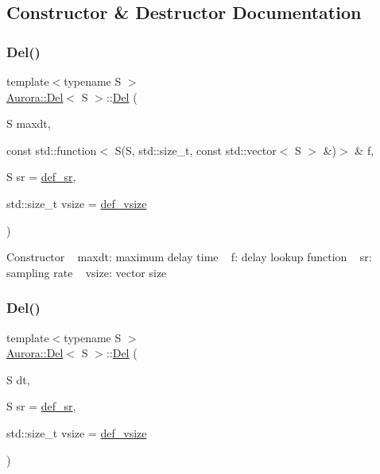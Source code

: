 \subsection{Constructor \& Destructor Documentation}
\mbox{\label{class_aurora_1_1_del_a9a66ca9cf80ef79c4823bc3c3faf348d}} 
\subsubsection{\texorpdfstring{Del()}{Del()}\hspace{0.1cm}{\footnotesize\ttfamily [1/2]}}
{\footnotesize\ttfamily template$<$typename S $>$ \\
\hyperlink{class_aurora_1_1_del}{Aurora\+::\+Del}$<$ S $>$\+::\hyperlink{class_aurora_1_1_del}{Del} (\begin{DoxyParamCaption}\item[{S}]{maxdt,  }\item[{const std\+::function$<$ S(S, std\+::size\+\_\+t, const std\+::vector$<$ S $>$ \&)$>$ \&}]{f,  }\item[{S}]{sr = {\ttfamily \hyperlink{namespace_aurora_ad49263d809bea98dd422e95bc91bc03e}{def\+\_\+sr}},  }\item[{std\+::size\+\_\+t}]{vsize = {\ttfamily \hyperlink{namespace_aurora_afaaddf667a06e7ce23c667a8b7295263}{def\+\_\+vsize}} }\end{DoxyParamCaption})\hspace{0.3cm}{\ttfamily [inline]}}

Constructor ~\newline
maxdt\+: maximum delay time ~\newline
f\+: delay lookup function ~\newline
sr\+: sampling rate ~\newline
vsize\+: vector size \mbox{\label{class_aurora_1_1_del_ae7ee559e909a215a6d8248d9c9a0ced8}} 
\subsubsection{\texorpdfstring{Del()}{Del()}\hspace{0.1cm}{\footnotesize\ttfamily [2/2]}}
{\footnotesize\ttfamily template$<$typename S $>$ \\
\hyperlink{class_aurora_1_1_del}{Aurora\+::\+Del}$<$ S $>$\+::\hyperlink{class_aurora_1_1_del}{Del} (\begin{DoxyParamCaption}\item[{S}]{dt,  }\item[{S}]{sr = {\ttfamily \hyperlink{namespace_aurora_ad49263d809bea98dd422e95bc91bc03e}{def\+\_\+sr}},  }\item[{std\+::size\+\_\+t}]{vsize = {\ttfamily \hyperlink{namespace_aurora_afaaddf667a06e7ce23c667a8b7295263}{def\+\_\+vsize}} }\end{DoxyParamCaption})\hspace{0.3cm}{\ttfamily [inline]}}

